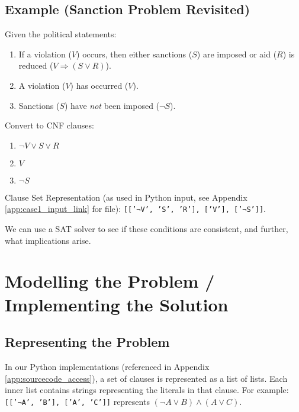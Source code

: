 \documentclass[11pt, a4paper]{article}
\begin{document}
\subsection*{Example (Sanction Problem Revisited)}
Given the political statements:
\begin{enumerate}
    \item If a violation ($V$) occurs, then either sanctions ($S$) are imposed or aid ($R$) is reduced ($V \Rightarrow (S \vee R)$).
    \item A violation ($V$) has occurred ($V$).
    \item Sanctions ($S$) have \textit{not} been imposed ($\neg S$).
\end{enumerate}

Convert to CNF clauses:
\begin{enumerate}
    \item $\neg V \vee S \vee R$
    \item $V$
    \item $\neg S$
\end{enumerate}

Clause Set Representation (as used in Python input, see Appendix \ref{app:case1_input_link} for file): \texttt{[['¬V', 'S', 'R'], ['V'], ['¬S']]}.

We can use a SAT solver to see if these conditions are consistent, and further, what implications arise.

\section{Modelling the Problem / Implementing the Solution} \label{sec:implementation}

\subsection*{Representing the Problem}
In our Python implementations (referenced in Appendix \ref{app:sourcecode_access}), a set of clauses is represented as a list of lists. Each inner list contains strings representing the literals in that clause. For example: \texttt{[['¬A', 'B'], ['A', 'C']]} represents $(\neg A \vee B) \wedge (A \vee C)$.
\end{document}
